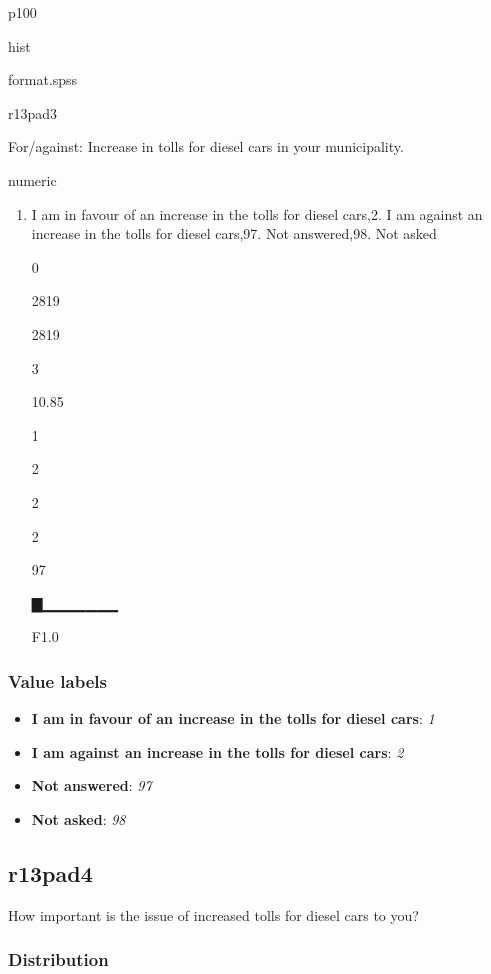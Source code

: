 \documentclass[]{book}
\providecommand{\tightlist}{%
  \setlength{\itemsep}{0pt}\setlength{\parskip}{0pt}}
\begin{document}
p100

hist

format.spss

r13pad3

For/against: Increase in tolls for diesel cars in your municipality.

numeric

\begin{enumerate}
\def\labelenumi{\arabic{enumi}.}
\tightlist
\item
  I am in favour of an increase in the tolls for diesel cars,2. I am
  against an increase in the tolls for diesel cars,97. Not answered,98.
  Not asked

  0

  2819

  2819

  3

  10.85

  1

  2

  2

  2

  97

  ▇▁▁▁▁▁▁▁

  F1.0
\end{enumerate}

\subsubsection{Value labels}\label{r13pad3_labels}

\begin{itemize}
\tightlist
\item
  \textbf{I am in favour of an increase in the tolls for diesel cars}:
  \emph{1}
\item
  \textbf{I am against an increase in the tolls for diesel cars}:
  \emph{2}
\item
  \textbf{Not answered}: \emph{97}
\item
  \textbf{Not asked}: \emph{98}
\end{itemize}

\subsection{r13pad4}\label{r13pad4}

How important is the issue of increased tolls for diesel cars to you?

\subsubsection{Distribution}\label{r13pad4_distribution}
\end{document}
